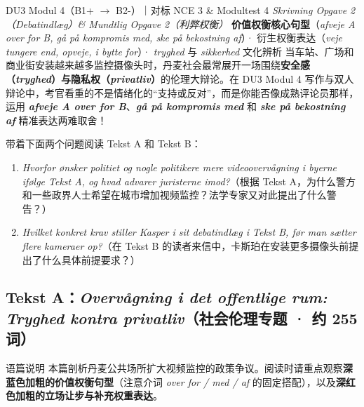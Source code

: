 {DU3 Modul 4（B1+ $\rightarrow$ B2-）｜对标 NCE 3 \& Modultest 4 \textit{Skrivning Opgave 2（Debatindlæg）\& Mundtlig Opgave 2（利弊权衡）}}
{\textbf{价值权衡核心句型}（\textit{afveje A over for B, gå på kompromis med, ske på bekostning af}）· 衍生权衡表达（\textit{veje tungere end, opveje, i bytte for}）· \textit{tryghed} 与 \textit{sikkerhed} 文化辨析}
{当车站、广场和商业街安装越来越多监控摄像头时，丹麦社会最常展开一场围绕\textbf{安全感（\textit{tryghed}）与隐私权（\textit{privatliv}）}的伦理大辩论。在 DU3 Modul 4 写作与双人辩论中，考官看重的不是情绪化的“支持或反对”，而是你能否像成熟评论员那样，运用 \textbf{\textit{afveje A over for B}}、\textbf{\textit{gå på kompromis med}} 和 \textbf{\textit{ske på bekostning af}} 精准表达两难取舍！}

\begin{foerduleaeser}
带着下面两个问题阅读 Tekst A 和 Tekst B：
\begin{enumerate}
  \item \textit{Hvorfor ønsker politiet og nogle politikere mere videoovervågning i byerne ifølge Tekst A, og hvad advarer juristerne imod?}（根据 Tekst A，为什么警方和一些政界人士希望在城市增加视频监控？法学专家又对此提出了什么警告？）
  \item \textit{Hvilket konkret krav stiller Kasper i sit debatindlæg i Tekst B, før man sætter flere kameraer op?}（在 Tekst B 的读者来信中，卡斯珀在安装更多摄像头前提出了什么具体前提要求？）
\end{enumerate}
\end{foerduleaeser}


\subsection*{Tekst A：\textit{Overvågning i det offentlige rum: Tryghed kontra privatliv}（社会伦理专题 · 约 255 词）}

\begin{tipbox}{语篇说明}
本篇剖析丹麦公共场所扩大视频监控的政策争议。阅读时请重点观察\textbf{\color{NCDNavy}深蓝色加粗的价值权衡句型}（注意介词 \textit{over for / med / af} 的固定搭配），以及\textbf{\color{NCDRed}深红色加粗的立场让步与补充权重表达}。
\end{tipbox}

